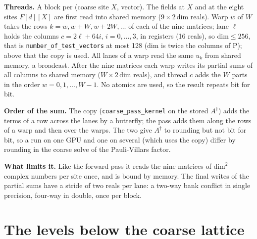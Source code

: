 \documentclass[11pt,a4paper]{article}
\numberwithin{equation}{section}
\newcommand{\code}[1]{\texttt{\small #1}}
\newcommand{\dg}{^{\dagger}}
\begin{document}
\textbf{Threads.} A block per (coarse site $X$, vector). The fields at $X$ and at the eight sites
$F[d][X]$ are first read into shared memory ($9\times2\,\text{dim}$ reals). Warp $w$ of $W$ takes
the rows $k = w, w+W, w+2W,\dots$ of each of the nine matrices; lane $\ell$ holds the columns
$c = 2\ell + 64i$, $i = 0,\dots,3$, in registers (16 reals), so $\text{dim}\le256$, that is
\code{number\_of\_test\_vectors} at most 128 (dim is twice the columns of P); above that the
copy is used. All lanes of a warp read the same $u_k$ from
shared memory, a broadcast. After the nine matrices each warp writes its partial sums of all
columns to shared memory ($W\times2\,\text{dim}$ reals), and thread $c$ adds the $W$ parts in
the order $w = 0,1,\dots,W-1$. No atomics are used, so the result repeats bit for bit.

\textbf{Order of the sum.} The copy (\code{coarse\_pass\_kernel} on the stored $A\dg$) adds the
terms of a row across the lanes by a butterfly; the pass adds them along the rows of a warp and
then over the warps. The two give $A\dg$ to rounding but not bit for bit, so a run on one GPU and
one on several (which uses the copy) differ by rounding in the coarse solve of the
Pauli-Villars factor.

\textbf{What limits it.} Like the forward pass it reads the nine matrices of $\text{dim}^2$
complex numbers per site once, and is bound by memory. The final writes of the partial sums
have a stride of two reals per lane: a two-way bank conflict in single precision, four-way in
double, once per block.

\section{The levels below the coarse lattice}
\end{document}
